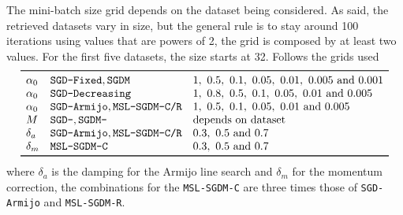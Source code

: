 The mini-batch size grid depends on the dataset being considered. As said, the retrieved datasets vary in size, but the general rule is to stay around 100 iterations using values that are powers of 2, the grid is composed by at least two values. For the first five datasets, the size starts at 32. Follows the grids used
\[
\begin{array}{lll}
\toprule
\alpha_0 & \text{\texttt{SGD-Fixed}}, \text{\texttt{SGDM}} & \numlist{1; 0.5; 0.1; 0.05; 0.01; 0.005; 0.001} \\
\alpha_0 & \text{\texttt{SGD-Decreasing}} & \numlist{1; 0.8; 0.5; 0.1; 0.05; 0.01; 0.005} \\
\alpha_0 & \text{\texttt{SGD-Armijo}}, \text{\texttt{MSL-SGDM-C/R}} & \numlist{1; 0.5; 0.1; 0.05; 0.01; 0.005} \\
M & \text{\texttt{SGD-}}, \text{\texttt{SGDM-}} & \text{depends on dataset} \\
\delta_a & \text{\texttt{SGD-Armijo}}, \text{\texttt{MSL-SGDM-C/R}} & \numlist{0.3;0.5;0.7} \\
\delta_m & \text{\texttt{MSL-SGDM-C}} & \numlist{0.3; 0.5; 0.7} \\
\bottomrule
\end{array}
\]
where $\delta_a$ is the damping for the Armijo line search and $\delta_m$ for the momentum correction, the combinations for the \texttt{MSL-SGDM-C} are three times those of \texttt{SGD-Armijo} and \texttt{MSL-SGDM-R}.

